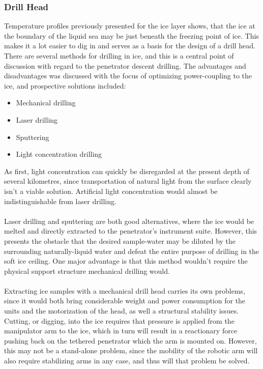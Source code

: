 \subsubsection{Drill Head}
Temperature profiles previously presented for the ice layer shows, that the ice at the boundary of the liquid sea may be just beneath the freezing point of ice. This makes it a lot easier to dig in and serves as a basis for the design of a drill head.\\
There are several methods for drilling in ice, and this is a central point of discussion with regard to the penetrator descent drilling. The advantages and disadvantages was discussed with the focus of optimizing power-coupling to the ice, and prospective solutions included:
\begin{itemize}
\item Mechanical drilling
\item Laser drilling
\item Sputtering
\item Light concentration drilling
\end{itemize}
As first, light concentration can quickly be disregarded at the present depth of several kilometres, since transportation of natural light from the surface clearly isn't a viable solution. Artificial light concentration would almost be indistinguishable from laser drilling.\\
\\
Laser drilling and sputtering are both good alternatives, where the ice would be melted and directly extracted to the penetrator's instrument suite. However, this presents the obstacle that the desired sample-water may be diluted by the surrounding naturally-liquid water and defeat the entire purpose of drilling in the soft ice ceiling. One major advantage is that this method wouldn't require the physical support structure mechanical drilling would.\\
\\
Extracting ice samples with a mechanical drill head carries its own problems, since it would both bring considerable weight and power consumption for the units and the motorization of the head, as well a structural stability issues. Cutting, or digging, into the ice requires that pressure is applied from the manipulator arm to the ice, which in turn will result in a reactionary force pushing back on the tethered penetrator which the arm is mounted on. However, this may not be a stand-alone problem, since the mobility of the robotic arm will also require stabilizing arms in any case, and thus will that problem be solved.\\
